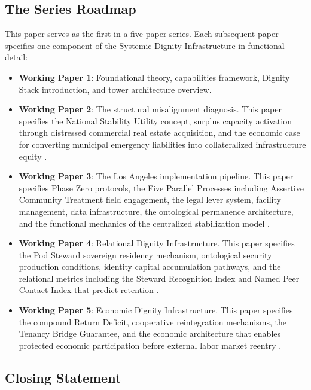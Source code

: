 \documentclass[12pt, letterpaper]{article}
\begin{document}
\subsection{The Series Roadmap}

This paper serves as the first in a five-paper series. Each subsequent paper specifies one component of the Systemic Dignity Infrastructure in functional detail:

\begin{itemize}
    \item \textbf{Working Paper 1}: Foundational theory, capabilities framework, Dignity Stack introduction, and tower architecture overview.
    \item \textbf{Working Paper 2}: The structural misalignment diagnosis. This paper specifies the National Stability Utility concept, surplus capacity activation through distressed commercial real estate acquisition, and the economic case for converting municipal emergency liabilities into collateralized infrastructure equity \citep{dibella_2026_wp2}.
    \item \textbf{Working Paper 3}: The Los Angeles implementation pipeline. This paper specifies Phase Zero protocols, the Five Parallel Processes including Assertive Community Treatment field engagement, the legal lever system, facility management, data infrastructure, the ontological permanence architecture, and the functional mechanics of the centralized stabilization model \citep{dibella_2026_wp3}.
    \item \textbf{Working Paper 4}: Relational Dignity Infrastructure. This paper specifies the Pod Steward sovereign residency mechanism, ontological security production conditions, identity capital accumulation pathways, and the relational metrics including the Steward Recognition Index and Named Peer Contact Index that predict retention \citep{dibella_2026_wp4}.
    \item \textbf{Working Paper 5}: Economic Dignity Infrastructure. This paper specifies the compound Return Deficit, cooperative reintegration mechanisms, the Tenancy Bridge Guarantee, and the economic architecture that enables protected economic participation before external labor market reentry \citep{dibella_2026_wp5}.
\end{itemize}

\subsection{Closing Statement}
\end{document}
